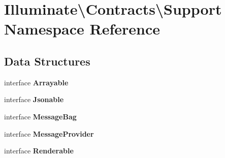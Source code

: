 \section{Illuminate\textbackslash{}Contracts\textbackslash{}Support Namespace Reference}
\label{namespace_illuminate_1_1_contracts_1_1_support}
\subsection*{Data Structures}
\begin{DoxyCompactItemize}
\item 
interface {\bf Arrayable}
\item 
interface {\bf Jsonable}
\item 
interface {\bf Message\+Bag}
\item 
interface {\bf Message\+Provider}
\item 
interface {\bf Renderable}
\end{DoxyCompactItemize}
